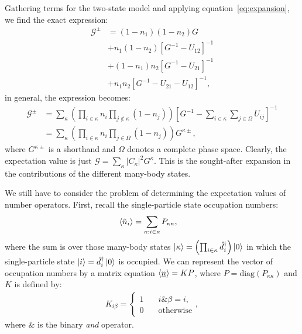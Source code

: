 \documentclass{article}
\begin{document}
\begin{multicols}{2}
        Gathering terms for the two-state model and applying equation~\ref{eq:expansion}, we find the exact expression:
        \begin{align}\label{eq:mbgf2}
            \mathscr{G}^\pm &= (1-n_1)(1-n_2) G \\ &+ n_1 (1-n_2) \left[ G^{-1} - U_{12}\right]^{-1} \nonumber\\ &+ (1-n_1)n_2 \left[ G^{-1} - U_{21}\right]^{-1} \nonumber\\ &+ n_1 n_2\left[ G^{-1} - U_{21} - U_{12}\right]^{-1} \nonumber,
        \end{align}
        in general, the expression becomes:
        \begin{align}\label{eq:mbgf}
        \mathscr{G}^\pm &= \sum_\kappa \left(\prod_{i\in\kappa} n_i \prod_{j\notin \kappa} (1-n_j) \right) \left[G^{-1} - \sum_{i\in\kappa} \sum_{j\in\Omega} U_{ij}\right]^{-1} \\
        \nonumber &= \sum_\kappa \left(\prod_{i\in\kappa} n_i \prod_{j\in\Omega} (1-n_j) \right) G^{\kappa\pm},
        \end{align}
        where $G^{\kappa\pm}$ is a shorthand and $\Omega$ denotes a complete phase space. Clearly, the expectation value is just $\mathscr{G} = \sum_\kappa \left|C_\kappa\right|^2 G^{\kappa}$. This is the sought-after expansion in the contributions of the different many-body states.
                  
        We still have to consider the problem of determining the expectation values of number operators. First, recall the single-particle state occupation numbers:
        \begin{align*}
            \braket{\hat{n}_i} &= \sum_{\kappa: i\in \kappa} P_{\kappa\kappa},
        \end{align*}
        where the sum is over those many-body states $\ket{\kappa}=\left(\prod_{i\in\kappa}\hat{d}_i^\dagger \right)\ket{0}$ in which the single-particle state $\ket{i} = \hat{d}_i^\dagger \ket{0}$ is occupied. We can represent the vector of occupation numbers by a matrix equation $\braket{\underline{n}} = KP$, where $P=\text{diag}(P_{\kappa\kappa})$ and $K$ is defined by:
        \begin{align}
            K_{i\beta} = \begin{cases} 1 & \quad i\&\beta=i, \\ 0 & \quad\text{otherwise}\end{cases},
        \label{eq:kmatrix}\end{align}
        where $\&$ is the binary \emph{and} operator.
        

\end{multicols}
\end{document}

